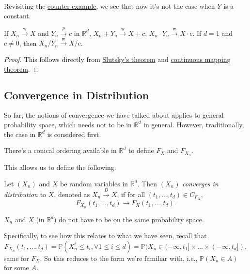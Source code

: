 Revisiting the \hyperref[eg:counter-example-continuous-mapping]{counter-example}, we see that now it's not the case when \(Y\) is a constant.

\begin{corollary}\label{col:Slutsky}
	If \(X_n \overset{\text{w} }{\to } X \) and \(Y_n \overset{p}{\to } c\) in \(\mathbb{R} ^d\), \(X_n \pm Y_n \overset{\text{w} }{\to } X \pm c\), \(X_n \cdot Y_n \overset{\text{w} }{\to } X \cdot c\). If \(d = 1\) and \(c \neq 0\), then \(X_n / Y_n \overset{\text{w} }{\to } X / c\).
\end{corollary}
\begin{proof}
	This follows directly from \hyperref[thm:Slutsky]{Slutsky's theorem} and \hyperref[thm:continuous-mapping]{continuous mapping theorem}.
\end{proof}

\subsection{Convergence in Distribution}
So far, the notions of convergence we have talked about applies to general probability space, which needs not to be in \(\mathbb{R} ^d\) in general. However, traditionally, the case in \(\mathbb{R} ^d\) is considered first.

\begin{intuition}
	There's a conical ordering available in \(\mathbb{R} ^d\) to define \(F_X\) and \(F_{X_n}\).
\end{intuition}

This allows us to define the following.

\begin{definition}\label{def:converge-in-distribution}
	Let \((X_n)\) and \(X\) be random variables in \(\mathbb{R} ^d\). Then \((X_n)\) \emph{converges in distribution} to \(X\), denoted as \(X_n \overset{D}{\to } X\), if for all \((t_1, \dots , t_d) \in C_{F_X}\),
	\[
		F_{X_n} (t_1, \dots , t_d) \to F_X (t_1, \dots , t_d).
	\]
\end{definition}

\begin{note}
	\(X_n\) and \(X\) (in \(\mathbb{R} ^d\)) do not have to be on the same probability space.
\end{note}

Specifically, to see how this relates to what we have seen, recall that
\[
	F_{X_n}(t_1, \dots , t_d)
	= \mathbb{P} (X_n^i \leq t_i , \forall1 \leq i \leq d)
	= \mathbb{P} (X_n \in (-\infty , t_1] \times \dots \times (-\infty , t_d]),
\]
same for \(F_X\). So this reduces to the form we're familiar with, i.e., \(\mathbb{P} (X_n \in A)\) for some \(A\).

